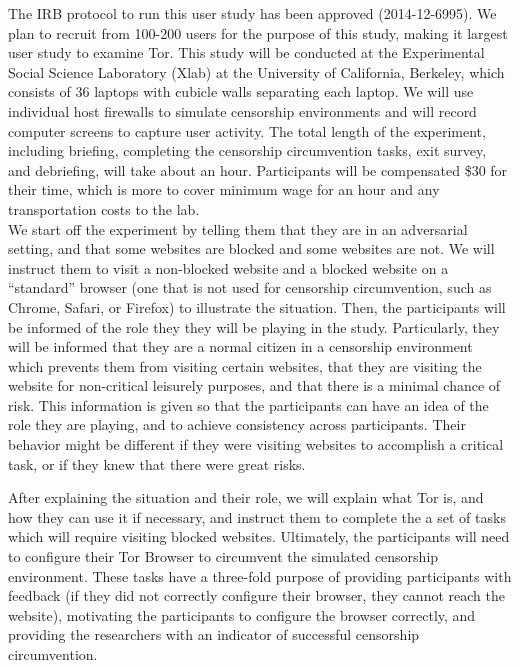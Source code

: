 \documentclass{template}
\begin{document}
The IRB protocol to run this user study has been approved (2014-12-6995). 
We plan to recruit from 100-200 users for the purpose of this study, 
making it largest user study to examine Tor.  This study will be conducted at the 
Experimental Social Science Laboratory (Xlab)
at the University of California, Berkeley, which consists of 36 laptops with 
cubicle walls separating each laptop. We will use individual host firewalls to simulate
censorship environments and will record computer screens to capture 
user activity. The total length of the experiment, including briefing, completing the censorship 
circumvention tasks, exit survey, and debriefing, will take about an hour. 
Participants will be compensated \$30 for their time, which is more to cover 
minimum wage for an hour and any transportation costs to the lab.  \\

We start off the experiment by telling them that they are in an adversarial setting, and that some websites are blocked and some websites are not. We will instruct them to visit a non-blocked website and a blocked website on a ``standard'' browser (one that is not used for censorship circumvention, such as Chrome, Safari, or Firefox) to illustrate the situation.
Then, the participants will be informed of the role they they will be playing in the study. Particularly,
they will be informed that they are a normal citizen in a censorship environment
which prevents them from visiting certain websites, that they are visiting the website for non-critical leisurely purposes,
and that there is a minimal chance of risk. This information is given so that the participants can have an idea of the role they are playing, and to achieve consistency across participants. Their behavior might be different if they were visiting websites to accomplish a critical task, or if they knew that there were great risks. 

After explaining the situation and their role, we will explain what Tor is, and how they can use it if necessary, and instruct them to complete the a set of tasks which will require visiting blocked websites. Ultimately, the participants will need to configure their Tor Browser to circumvent the simulated censorship environment. These tasks have a three-fold purpose of providing participants with feedback (if they did not correctly configure their browser, they cannot reach the website),  motivating the participants to configure the browser correctly, and providing the researchers with an indicator of successful censorship circumvention. 
\end{document}
